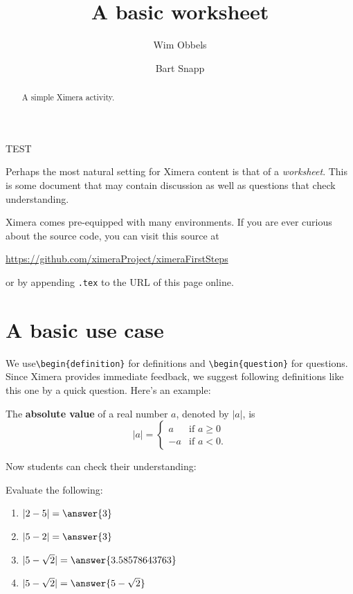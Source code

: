 \documentclass{ximera}
\title{A basic worksheet}
\author{Wim Obbels \and Bart Snapp}
\begin{document}
\begin{abstract}
    A simple Ximera activity.
\end{abstract}
\maketitle
\label{xim:aFirstActivity}

TEST

Perhaps the most natural setting for Ximera content is that of a
\textit{worksheet}. This is some document that may contain discussion as well
as questions that check understanding.

Ximera comes pre-equipped with many environments.  If you are ever curious about
the source code, you can visit this source at

\begin{center}
    \url{https://github.com/ximeraProject/ximeraFirstSteps}
\end{center}
or by appending \verb|.tex| to the URL of this page online. 


\section{A basic use case}
We use\verb|\begin{definition}| for definitions and \verb|\begin{question}| for
questions. Since Ximera provides immediate feedback, we suggest following
definitions like this one by a quick question. Here's an example:

\begin{definition}\label{def:absolute_value}
    The \textbf{absolute value} of a real number $a$, denoted by $|a|$, is
    \[
        |a| = \begin{cases}
            a  & \text{if $a \geq 0$} \\
            -a & \text{if $a<0$.}
        \end{cases}
    \]
\end{definition}
Now students can check their understanding:
\begin{question}
    Evaluate the following:
    \begin{enumerate}
        \item $|2-5| = \answer{3}$
        \item $|5-2| = \answer{3}$
        \item $|5-\sqrt{2}| = \answer{3.58578643763}$
        \item $|5-\sqrt{2}| = \answer{5-\sqrt{2}}$
    \end{enumerate}
\end{question}
\end{document}
